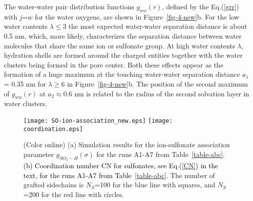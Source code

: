 \documentclass[3p,english,preprint]{elsarticle}
\newcommand{\need}[1]{\textcolor{black}{#1}}
\newcommand{\mage}[1]{\textcolor{black}{#1}}
\begin{document}
The water-water pair distribution functions $g_{ww}(r)$, defined by  
the Eq.(\ref{grr}) with $j$=$w$ for the water oxygens,
  are shown in Figure~\ref{fig-4-new}b. 
For the low water contents $\lambda$$\leq$3 the most expected 
water-water separation distance is  about 0.5 nm, which,  
 more likely, characterizes the separation distance 
between water molecules that share the same ion or  sulfonate group. 
At high water contents $\lambda$, hydration shells   are formed  
around the charged entities together with the water clusters being formed in the pore center. 
Both these effects appear as the formation of a  huge maximum 
at the touching water-water separation distance $a_1$= 0.35 nm for $\lambda$$\geq$6 
 in Figure~\ref{fig-4-new}b.
 The position of the second maximum of $g_{ww}(r)$ at 
$a_2$$\approx$0.6 nm is related to the radius of the second solvation layer  
in water clusters.   




\begin{figure}  [!ht]
\begin{center}
\texttt{[image: SO-ion-association\_new.eps]}
\texttt{[image: coordination.eps]}
\end{center}
\vspace{-0.75cm}
\caption{(Color online) (a) Simulation results for the ion-sulfonate association
parameter  $g_{SO_3-H}(\sigma)$ for the runs A1-A7 from 
Table~\ref{table-abc}. 
{\need{ 
(b) Coordination number CN for sulfonates, see Eq.(\ref{CN}) in the text, 
for the runs A1-A7 from Table~\ref{table-abc}. 
}}
The number of grafted sidechains is $N_S$=100 for the blue line with squares, 
and $N_S$=200 for the red line with circles. %
\label{fig-5-new}} 
\end{figure}
\end{document}
